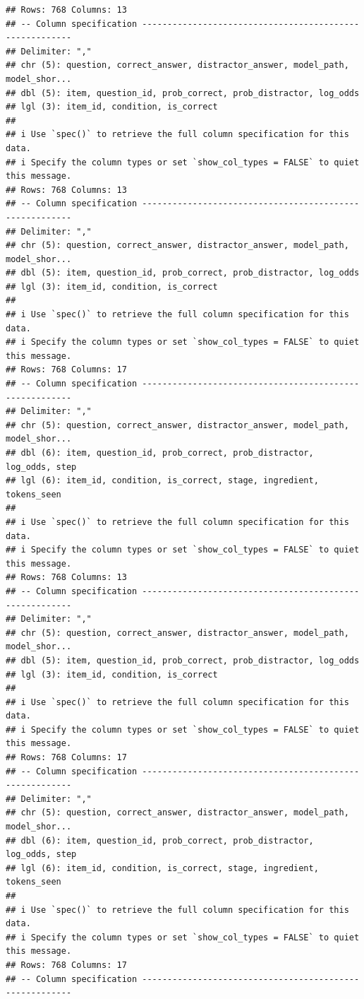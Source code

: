 \documentclass[
]{article}
\begin{document}
\begin{verbatim}
## Rows: 768 Columns: 13
## -- Column specification --------------------------------------------------------
## Delimiter: ","
## chr (5): question, correct_answer, distractor_answer, model_path, model_shor...
## dbl (5): item, question_id, prob_correct, prob_distractor, log_odds
## lgl (3): item_id, condition, is_correct
## 
## i Use `spec()` to retrieve the full column specification for this data.
## i Specify the column types or set `show_col_types = FALSE` to quiet this message.
## Rows: 768 Columns: 13
## -- Column specification --------------------------------------------------------
## Delimiter: ","
## chr (5): question, correct_answer, distractor_answer, model_path, model_shor...
## dbl (5): item, question_id, prob_correct, prob_distractor, log_odds
## lgl (3): item_id, condition, is_correct
## 
## i Use `spec()` to retrieve the full column specification for this data.
## i Specify the column types or set `show_col_types = FALSE` to quiet this message.
## Rows: 768 Columns: 17
## -- Column specification --------------------------------------------------------
## Delimiter: ","
## chr (5): question, correct_answer, distractor_answer, model_path, model_shor...
## dbl (6): item, question_id, prob_correct, prob_distractor, log_odds, step
## lgl (6): item_id, condition, is_correct, stage, ingredient, tokens_seen
## 
## i Use `spec()` to retrieve the full column specification for this data.
## i Specify the column types or set `show_col_types = FALSE` to quiet this message.
## Rows: 768 Columns: 13
## -- Column specification --------------------------------------------------------
## Delimiter: ","
## chr (5): question, correct_answer, distractor_answer, model_path, model_shor...
## dbl (5): item, question_id, prob_correct, prob_distractor, log_odds
## lgl (3): item_id, condition, is_correct
## 
## i Use `spec()` to retrieve the full column specification for this data.
## i Specify the column types or set `show_col_types = FALSE` to quiet this message.
## Rows: 768 Columns: 17
## -- Column specification --------------------------------------------------------
## Delimiter: ","
## chr (5): question, correct_answer, distractor_answer, model_path, model_shor...
## dbl (6): item, question_id, prob_correct, prob_distractor, log_odds, step
## lgl (6): item_id, condition, is_correct, stage, ingredient, tokens_seen
## 
## i Use `spec()` to retrieve the full column specification for this data.
## i Specify the column types or set `show_col_types = FALSE` to quiet this message.
## Rows: 768 Columns: 17
## -- Column specification --------------------------------------------------------

\end{verbatim}
\end{document}
